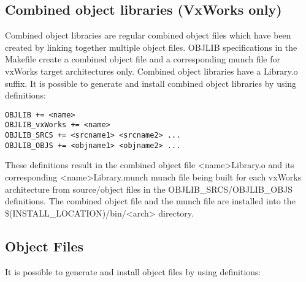 \subsection{ Combined object libraries (VxWorks only)}

Combined object libraries are regular combined object files which have been created by linking together multiple object 
files. OBJLIB specifications in the Makefile create a combined object file and a corresponding munch file for vxWorks 
target architectures only. Combined object libraries have a Library.o suffix. It is possible to generate and install combined 
object libraries by using definitions:

\begin{verbatim}OBJLIB += <name>
OBJLIB_vxWorks += <name>
OBJLIB_SRCS += <srcname1> <srcname2> ...
OBJLIB_OBJS += <objname1> <objname2> ...
\end{verbatim}
These definitions result in the combined object file \textless{}name\textgreater{}Library.o and its corresponding \textless{}name\textgreater{}Library.munch munch 
file being built for each vxWorks architecture from source/object files in the OBJLIB\_SRCS/OBJLIB\_OBJS definitions. 
The combined object file and the munch file are installed into the \$(INSTALL\_LOCATION)/bin/\textless{}arch\textgreater{} directory. 

\subsection{Object Files}

It is possible to generate and install object files by using definitions:


